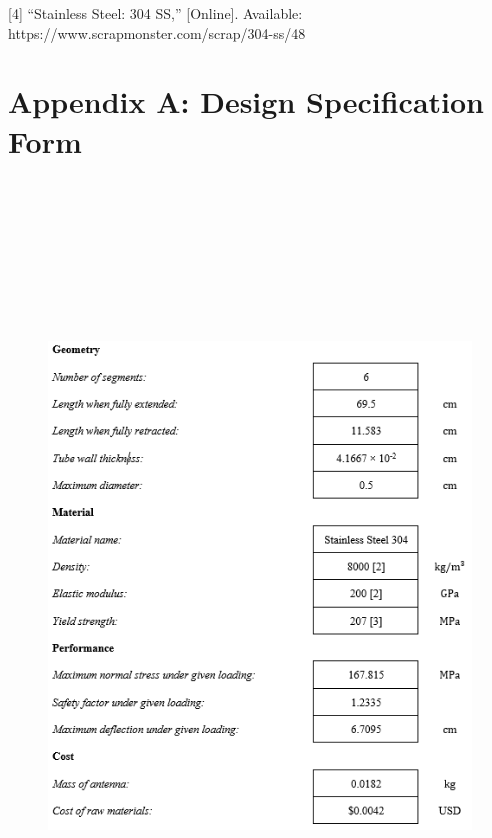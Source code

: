 \documentclass[12pt]{article}
\begin{document}
[4] “Stainless Steel: 304 SS,” [Online]. Available: https://www.scrapmonster.com/scrap/304-ss/48
\newpage

\section{Appendix A: Design Specification Form}
\begin{figure}[H] 
\includegraphics[height= 21.5cm, width= 17.5cm]{Appendix_A.png}
\end{figure}
\newpage
\end{document}
